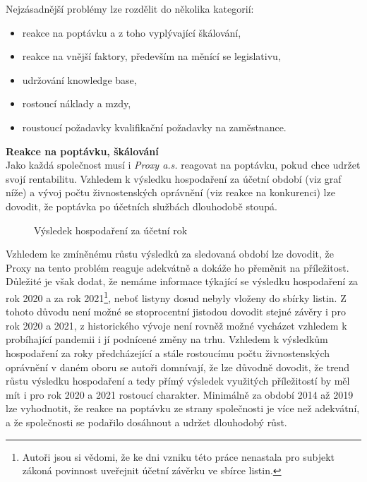 Nejzásadnější problémy lze rozdělit do několika kategorií:\\

\begin{itemize}
	\item reakce na poptávku a z toho vyplývající škálování,
	\item reakce na vnější faktory, především na měnící se legislativu,
	\item udržování knowledge base,
	\item rostoucí náklady a mzdy,
	\item roustoucí požadavky kvalifikační požadavky na zaměstnance.
\end{itemize}

\vspace*{5mm}

\newpage

\textbf{Reakce na poptávku, škálování}\\

Jako každá společnost musí i \textit{Proxy a.s.} reagovat na poptávku, pokud chce udržet svojí rentabilitu. Vzhledem k výsledku hospodaření za účetní období (viz graf níže) a vývoj počtu živnostenských oprávnění (viz reakce na konkurenci) lze dovodit, že poptávka po účetních službách dlouhodobě stoupá.

\begin{figure}[!htbp]
	\caption[Výsledek hospodaření za účetní rok]{Výsledek hospodaření za účetní rok}
	\label{fig:vhzur}
\end{figure}

Vzhledem ke zmíněnému růstu výsledků za sledovaná období lze dovodit, že Proxy na tento problém reaguje adekvátně a dokáže ho přeměnit na příležitost.\\

Důležité je však dodat, že nemáme informace týkající se výsledku hospodaření za rok 2020 a za rok 2021\footnote{Autoři jsou si vědomi, že ke dni vzniku této práce nenastala pro subjekt zákoná povinnost uveřejnit účetní závěrku ve sbírce listin.}, neboť listyny dosud nebyly vloženy do sbírky listin. Z tohoto důvodu není možné se stoprocentní jistodou dovodit stejné závěry i pro rok 2020 a 2021, z historického vývoje není rovněž možné vycházet vzhledem k probíhající pandemii i jí podnícené změny na trhu. Vzhledem k výsledkům hospodaření za roky předcházející a stále rostoucímu počtu živnostenských oprávnění v daném oboru se autoři domnívají, že lze důvodně dovodit, že trend růstu výsledku hospodaření a tedy přímý výsledek využitých příležitostí by měl mít i pro rok 2020 a 2021 rostoucí charakter. Minimálně za období 2014 až 2019 lze vyhodnotit, že reakce na poptávku ze strany společnosti je více než adekvátní, a že společnosti se podařilo dosáhnout a udržet dlouhodobý růst.\\

